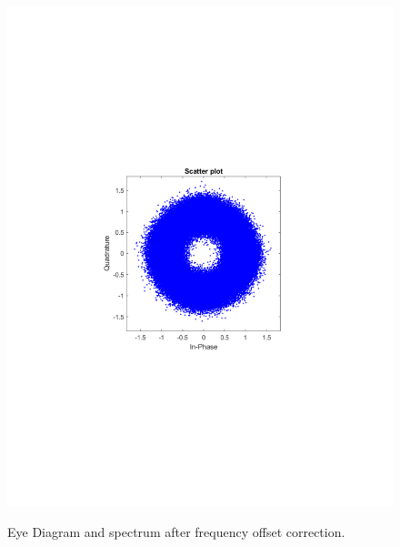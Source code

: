 \begin{refsection}
\begin{figure}[H]
\begin{minipage}{0.30\textwidth}
		\includegraphics[clip, trim=4cm 8cm 4cm 8cm, width=1\textwidth]{./sdf/m_qam_system/figures/expResults/intradyne/4_const_16GBdInSig13dB_AfFE.pdf}
		\label{fig:16GBdSpecBefFec}
	\end{minipage}
	\caption{Eye Diagram and spectrum after frequency offset correction.}
\end{figure}


\end{refsection}
